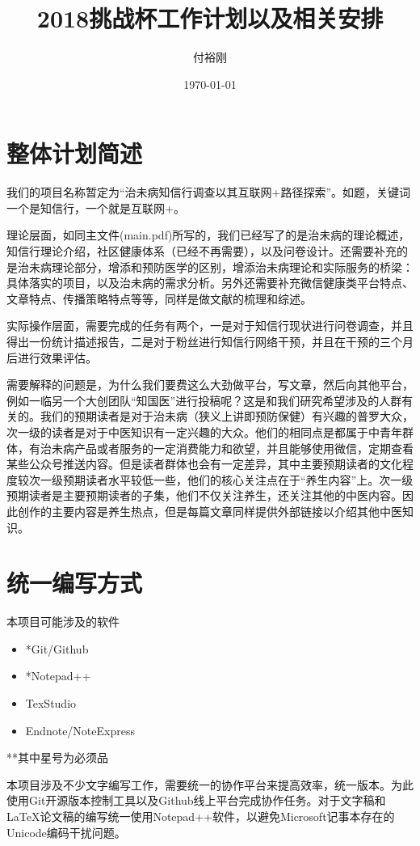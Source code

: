\documentclass{article}
\title{2018挑战杯工作计划以及相关安排}
\author{付裕刚}
\date{\today}
\begin{document}
    \maketitle
    \section{整体计划简述}
    我们的项目名称暂定为“治未病知信行调查以其互联网+路径探索”。如题，关键词一个是知信行，一个就是互联网+。
    
    理论层面，如同主文件(main.pdf)所写的，我们已经写了的是治未病的理论概述，知信行理论介绍，社区健康体系（已经不再需要），以及问卷设计。还需要补充的是治未病理论部分，增添和预防医学的区别，增添治未病理论和实际服务的桥梁：具体落实的项目，以及治未病的需求分析。另外还需要补充微信健康类平台特点、文章特点、传播策略特点等等，同样是做文献的梳理和综述。
    
    实际操作层面，需要完成的任务有两个，一是对于知信行现状进行问卷调查，并且得出一份统计描述报告，二是对于粉丝进行知信行网络干预，并且在干预的三个月后进行效果评估。
    
    需要解释的问题是，为什么我们要费这么大劲做平台，写文章，然后向其他平台，例如一临另一个大创团队“知国医”进行投稿呢？这是和我们研究希望涉及的人群有关的。我们的预期读者是对于治未病（狭义上讲即预防保健）有兴趣的普罗大众，次一级的读者是对于中医知识有一定兴趣的大众。他们的相同点是都属于中青年群体，有治未病产品或者服务的一定消费能力和欲望，并且能够使用微信，定期查看某些公众号推送内容。但是读者群体也会有一定差异，其中主要预期读者的文化程度较次一级预期读者水平较低一些，他们的核心关注点在于“养生内容”上。次一级预期读者是主要预期读者的子集，他们不仅关注养生，还关注其他的中医内容。因此创作的主要内容是养生热点，但是每篇文章同样提供外部链接以介绍其他中医知识。
    \section{统一编写方式}
    \begin{spacing}{0.7}
    本项目可能涉及的软件
    \begin{itemize}
        \item *Git/Github
        \item *Notepad++
        \item TexStudio
        \item Endnote/NoteExpress
    \end{itemize}
**其中星号为必须品
\newline
\end{spacing}
本项目涉及不少文字编写工作，需要统一的协作平台来提高效率，统一版本。为此使用Git开源版本控制工具以及Github线上平台完成协作任务。对于文字稿和\LaTeX 论文稿的编写统一使用Notepad++软件，以避免Microsoft记事本存在的Unicode编码干扰问题。
\end{document}
